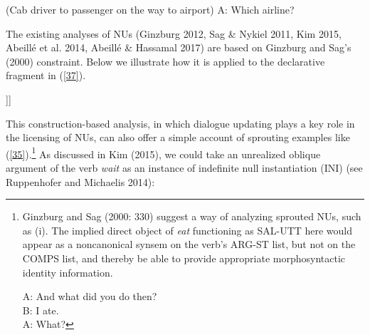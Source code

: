 \documentclass[output=paper
                ,modfonts
                ,nonflat
	        ,collection
	        ,collectionchapter
	        ,collectiontoclongg
 	        ,biblatex
                ,babelshorthands
                ,newtxmath
                ,draftmode
                ,colorlinks, citecolor=brown
]{./langsci/langscibook}
\begin{document}
{  \ea (Cab driver to passenger on the way to airport) A: Which airline?\label{40}\z

The existing analyses of NUs (Ginzburg 2012, Sag \& Nykiel 2011, Kim 2015, Abeill\'{e} et al. 2014, Abeill\'{e} \& Hassamal 2017) are based on Ginzburg and Sag's (2000) constraint. Below we illustrate how it is applied to the declarative fragment in (\ref{37}).

\ea\label{41}
\begin{forest}
[\begin{avm}\avml \hfil S\\
\[CAT &\[HEAD v\]\\
 CTXT & \[MAX-QUD $\lambda$\{$\pi$$^{i}$\}\[{\it break}({\it b,i})\]\\
  SAL-UTT \{\[CAT\ \@2\\
                          CONT & \[IND & {\it i}\\
                                 \] \]\}\]\]  \avmr \end{avm}
[\begin{avm}\avml \hfil NP\\
             \[CAT  \@2\\
  CONT & \[IND & {\it i}%
   \]\]\avmr\end{avm}
 [The mike]]]
\end{forest}
\z  

This construction-based analysis, in which dialogue updating plays
a key role in the licensing of NUs, can also offer a simple account of
sprouting examples like (\ref{35}).\footnote{Ginzburg and Sag (2000: 330) suggest a way of analyzing sprouted NUs, such as (i). The implied direct object of {\it eat} functioning as SAL-UTT here would appear as a noncanonical synsem on the verb's ARG-ST list, but not on the COMPS list, and thereby be able to provide appropriate morphosyntactic identity information.

\ea  A: And what did you do then? \\B: I ate. \\A: What?\z


} As discussed in Kim (2015), we could take an unrealized oblique argument of
the verb {\it wait} as an instance of indefinite null instantiation (INI) (see Ruppenhofer and Michaelis 2014):

}
\end{document}
